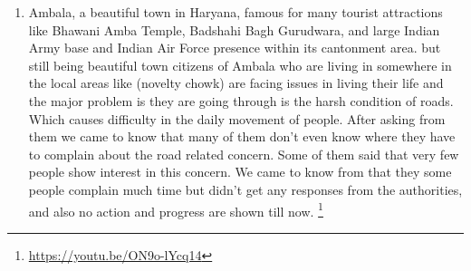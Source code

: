 \documentclass[acmtog]{acmart}
\begin{document}
\begin{description}
\begin{enumerate}
        \footnote[3]{\url{https://economictimes.indiatimes.com/news/politics-and-nation/digital-india-government-websites-fail-to-clear-transparency-test/articleshow/53781991.cms?from=mdr
        }}
        \item Ambala, a beautiful town in Haryana, famous for many tourist attractions like Bhawani Amba Temple, Badshahi Bagh Gurudwara, and large Indian Army base and Indian Air Force presence within its cantonment area. but still being beautiful town citizens of Ambala who are living in somewhere in the local areas like (novelty chowk) are facing issues in living their life and the major problem is they are going through is the harsh condition of roads. Which causes difficulty in the daily movement of people. After asking from them we came to know that many of them don’t even know where they have to complain about the road related concern. Some of them said that very few people show interest in this concern. We came to know from that they some people complain much time but didn’t get any responses from the authorities, and also no action and progress are shown till now. 
        \footnote[4]{\url{https://youtu.be/ON9o-lYcq14}}
    \end{enumerate}

\end{description}

\clearpage
\end{document}
